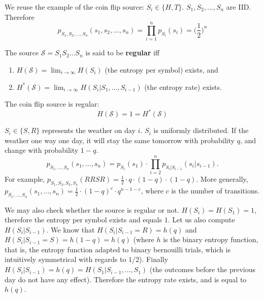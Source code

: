 \documentclass{report}
\begin{document}
\begin{exmp}
	We reuse the example of the coin flip source: $S_i \in \{H, T\}$. $S_1, S_2, \ldots, S_n$ are IID. Therefore 
	\begin{equation*}
	p_{S_1, S_2, \ldots, S_n}(s_1, s_2, \ldots, s_n) = \prod_{i=1}^n p_{S_i}(s_i) = \bigl(\frac12\bigr)^n
	\end{equation*}
\end{exmp}

\begin{defn}
	The source $\mathcal S = S_1 S_2 \ldots S_n$ is said to be \textbf{regular} iff
	\begin{enumerate}
		\item $H(\mathcal S) = \lim_{i \to \infty} H(S_i)$ (the entropy per symbol) exists, and
		\item $H^*(\mathcal S) = \lim_{i \to \infty} H(S_i | S_1, \ldots, S_{i-1})$ (the entropy rate) exists.
	\end{enumerate}
\end{defn}

\begin{exmp}[cont.]
	The coin flip source is regular:
	\begin{equation*}
		H(\mathcal S) = 1 = H^*(\mathcal S)
	\end{equation*}
\end{exmp}

\label{exmp:sunnyrainymarkov}\begin{exmp}
	$S_i \in \{S, R\}$ represents the weather on day $i$. $S_i$ is uniformly distributed. If the weather one way one day, it will stay the same tomorrow with probability $q$, and change with probability $1-q$.
	\begin{equation*}
		p_{S_1, \ldots, S_n} (s_1, \ldots, s_n) =  p_{S_1}(s_1) \cdot \prod_{i = 2}^n p_{S_i | S_{i-1}}(s_i | s_{i-1}).
	\end{equation*}
	For example, $p_{S_1, S_2, S_3, S_4} (RRSR) = \frac12 \cdot q \cdot (1-q) \cdot (1-q)$. More generally, $p_{S_1, \ldots, S_n}(s_1, \ldots, s_n) = \frac12 \cdot (1-q)^c \cdot q^{n-1-c}$, where $c$ is the number of transitions. \par
	We may also check whether the source is regular or not. $H(S_i) = H(S_1) = 1$, therefore the entropy per symbol exists and equals $1$. Let us also compute $H(S_i | S_{i-1})$. We know that $H(S_i | S_{i-1} = R) = h(q)$ and $H(S_i | S_{i-1} = S) = h(1-q) = h(q)$ (where $h$ is the binary entropy function, that is, the entropy function adapted to binary bernouilli trials, which is intuitively symmetrical with regards to $1/2$). Finally $H(S_i | S_{i-1}) = h(q) = H(S_1 | S_{i-1}, \ldots, S_1)$ (the outcomes before the previous day do not have any effect). Therefore the entropy rate exists, and is equal to $h(q)$.
\end{exmp}
\end{document}
